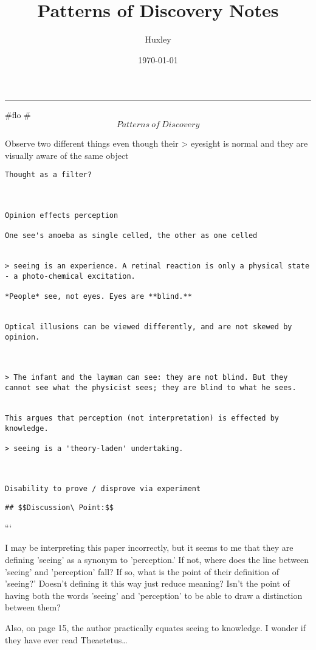 \documentclass[letterpaper]{article}
\author{Huxley}
\date{\today}
\title{Patterns of Discovery Notes}
\renewcommand\maketitle{}
\begin{document}
\maketitle
\noindent\rule{\textwidth}{0.5pt}

\#flo \# \[Patterns\ of\ Discovery\]

Observe two different things even though their > eyesight is normal and
they are visually aware of the same object

\begin{verbatim}
Thought as a filter? 



Opinion effects perception

One see's amoeba as single celled, the other as one celled 


> seeing is an experience. A retinal reaction is only a physical state - a photo-chemical excitation. 

*People* see, not eyes. Eyes are **blind.** 


Optical illusions can be viewed differently, and are not skewed by opinion. 



> The infant and the layman can see: they are not blind. But they cannot see what the physicist sees; they are blind to what he sees. 


This argues that perception (not interpretation) is effected by knowledge.

> seeing is a 'theory-laden' undertaking. 



Disability to prove / disprove via experiment 

\end{verbatim}

\begin{verbatim}
## $$Discussion\ Point:$$ 
\end{verbatim}

```

I may be interpreting this paper incorrectly, but it seems to me that
they are defining 'seeing' as a synonym to 'perception.' If not, where
does the line between 'seeing' and 'perception' fall? If so, what is the
point of their definition of 'seeing?' Doesn't defining it this way just
reduce meaning? Isn't the point of having both the words 'seeing' and
'perception' to be able to draw a distinction between them?

Also, on page 15, the author practically equates seeing to knowledge. I
wonder if they have ever read Theaetetus\ldots{}
\end{document}
